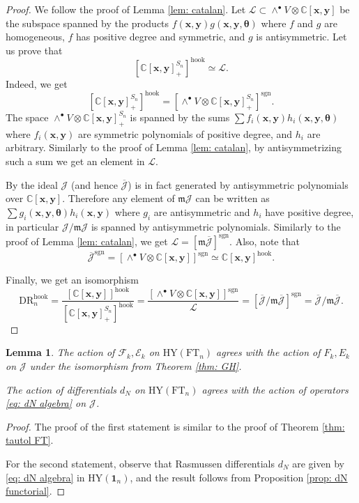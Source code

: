 \documentclass{amsart}
\newcommand{\C}{\mathbb{C}}
\newcommand{\xx}{\mathbf{x}}
\newcommand{\yy}{\mathbf{y}}
\newcommand{\ttheta}{\boldsymbol{\theta}}
\newcommand{\mm}{\mathfrak{m}}
\newcommand{\DR}{\mathrm{DR}}
\newcommand{\FT}{\mathrm{FT}}
\newcommand{\HY}{\mathrm{HY}}
\newcommand{\sgn}{\mathrm{sgn}}
\newcommand{\one}{\mathbf{1}}
\newcommand{\CE}{\mathcal{E}}
\newcommand{\CF}{\mathcal{F}}
\newcommand{\hook}{\mathrm{hook}}
\newcommand{\cJ}{\mathcal{J}}
\newcommand{\cL}{\mathcal{L}}
\numberwithin{equation}{section}
\newtheorem{lemma}[theorem]{Lemma}
\theoremstyle{definition}
\begin{document}
\begin{proof}
We follow the proof of Lemma \ref{lem: catalan}.
Let $\cL\subset \wedge^{\bullet}V\otimes \C[\xx,\yy]$ be the subspace spanned by the products $f(\xx,\yy)g(\xx,\yy,\ttheta)$ where $f$ and $g$ are homogeneous, $f$ has positive degree and symmetric, and $g$ is antisymmetric. 
Let us prove that 
$$
\left[\C[\xx,\yy]^{S_n}_{+}\right]^{\hook}\simeq\cL.
$$
Indeed, we get
$$
\left[\C[\xx,\yy]^{S_n}_{+}\right]^{\hook} =\left[\wedge^{\bullet}V\otimes \C[\xx,\yy]^{S_n}_{+}\right]^{\sgn}.
$$
The space $\wedge^{\bullet}V\otimes \C[\xx,\yy]^{S_n}_{+}$ is spanned by the sums $\sum f_i(\xx,\yy)h_i(\xx,\yy,\ttheta)$ where $f_i(\xx,\yy)$ are symmetric polynomials of positive degree, and $h_i$ are arbitrary. Similarly to the proof of Lemma \ref{lem: catalan}, by antisymmetrizing such a sum we get an element in $\cL$.

By \cite[Lemma 7.5]{GH} the ideal $\cJ$ (and hence $\overline{\cJ}$) is in fact generated by antisymmetric polynomials over $\C[\xx,\yy]$. Therefore any element of $\mm\cJ$ can be written as $\sum g_i(\xx,\yy,\ttheta)h_i(\xx,\yy)$ where $g_i$ are antisymmetric and $h_i$ have positive degree, in particular $\cJ/\mm\cJ$ is spanned by antisymmetric polynomials. Similarly to the proof of Lemma \ref{lem: catalan}, we get 
$\cL=\left[\mm\overline{\cJ}\right]^{\sgn}$. 
Also, note that $$\overline{\cJ}^{\sgn}=\left[\wedge^{\bullet}V\otimes \C[\xx,\yy]\right]^{\sgn}\simeq \C[\xx,\yy]^{\hook}.
$$ 
  
Finally, we get an isomorphism
$$
\DR_n^{\hook} =
\frac{\left[\C[\xx,\yy]\right]^{\hook}}{\left[\C[\xx,\yy]^{S_n}_{+}\right]^{\hook}}=\frac{\left[\wedge^{\bullet}V\otimes \C[\xx,\yy]\right]^{\sgn}}{\cL}= 
\left[\overline{\cJ}/\mm\overline{\cJ}\right]^{\sgn}=\overline{\cJ}/\mm\overline{\cJ}.
$$

\end{proof}


\begin{lemma}
The action of $\CF_k,\CE_k$ on $\HY(\FT_n)$ 
agrees with the action of $F_k,E_k$ on $\cJ$ under the isomorphism from Theorem \ref{thm: GH}.

The action of  differentials $d_N$ on $\HY(\FT_n)$ agrees with the action of operators \eqref{eq: dN algebra} on $\cJ$.
\end{lemma}

\begin{proof}
The proof of the first statement is similar to the proof of Theorem \ref{thm: tautol FT}. 

For the second statement, observe that Rasmussen differentials $d_N$ are given by \eqref{eq: dN algebra} in $\HY(\one_n)$, and the result follows from Proposition \ref{prop: dN functorial}.
\end{proof}
\end{document}
